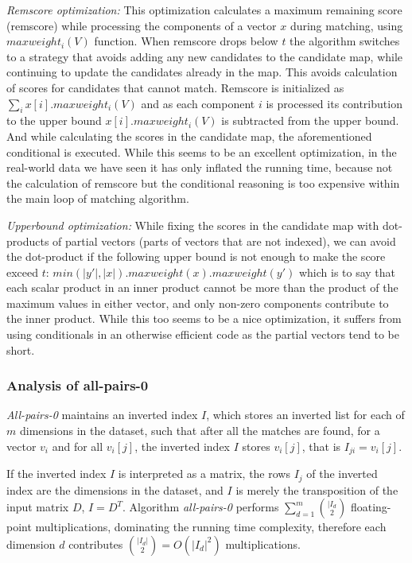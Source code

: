 \documentclass{comjnl}
\newcommand{\var}[1]{\mbox{\textsl{#1}}} %
\begin{document}
\begin{description}
  \emph{Remscore optimization:} This optimization calculates a maximum
  remaining score (remscore) while processing the components of a
  vector $x$ during matching, using $maxweight_i(V)$ function. When
  remscore drops below $t$ the algorithm switches to a strategy that
  avoids adding any new candidates to the candidate map, while
  continuing to update the candidates already in the map. This avoids
  calculation of scores for candidates that cannot match. Remscore is
  initialized as $\sum_ix[i].maxweight_i(V)$ and as each component $i$
  is processed its contribution to the upper bound
  $x[i].maxweight_i(V)$ is subtracted from the upper bound. And while
  calculating the scores in the candidate map, the aforementioned
  conditional is executed. While this seems to be an excellent
  optimization, in the real-world data we have seen it has only
  inflated the running time, because not the calculation of remscore but
  the conditional reasoning is too expensive within the main loop of
  matching algorithm.

  \emph{Upperbound optimization:} While fixing the scores in the
  candidate map with dot-products of partial vectors (parts of vectors
  that are not indexed), we can avoid the dot-product if the following
  upper bound is not enough to make the score exceed $t$: $min(|y'|,
  |x|). maxweight(x) . maxweight(y')$ which is to say that each scalar
  product in an inner product cannot be more than the product of the
  maximum values in either vector, and only non-zero components
  contribute to the inner product. While this too seems to be a nice
  optimization, it suffers from using conditionals in an otherwise
  efficient code as the partial vectors tend to be short.

\end{description}

\subsubsection{Analysis of all-pairs-0}

\var{All-pairs-0} maintains an inverted index $I$, which
stores an inverted list for each of $m$ dimensions in the dataset,
such that after all the matches are found, for a vector $v_i$ and for all
$v_i[j]$, the inverted index $I$ stores $v_i[j]$, that is $I_{ji} = v_i[j]$.

If the inverted index $I$ is interpreted as a matrix, the rows $I_j$
of the inverted index are the dimensions in the dataset, and $I$ is
merely the transposition of the input matrix $D$, $I=D^T$.  Algorithm
\var{all-pairs-0} performs $\sum_{d=1}^{m}\binom{|I_d}{2}$ floating-point
multiplications, dominating the running time complexity, therefore
each dimension $d$ contributes $\binom{|I_d|}{2}=O(|I_d|^2)$
multiplications.
\end{document}
